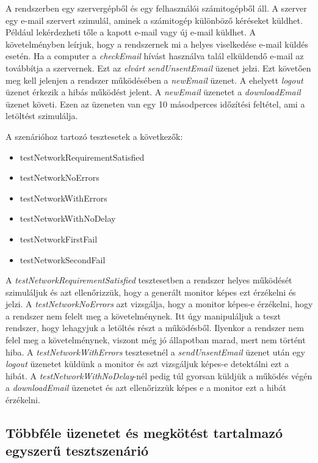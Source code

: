 A rendszerben egy szervergépből és egy felhasználói számitogépből áll.
A szerver egy e-mail szervert szimulál, aminek a számitogép különböző kéréseket küldhet.
Például lekérdezheti tőle a kapott e-mail vagy új e-mail küldhet.
A követelményben leírjuk, hogy a rendszernek mi a helyes viselkedése e-mail küldés esetén.
Ha a computer a \textit{checkEmail} hívást használva talál elküldendő e-mail az továbbítja a szervernek.
Ezt az \textit{elvárt} \textit{sendUnsentEmail} üzenet jelzi.
Ezt követően meg kell jelenjen a rendszer működésében a \textit{newEmail} üzenet.
A ehelyett \textit{logout} üzenet érkezik a hibás működést jelent.
A \textit{newEmail} üzenetet a \textit{downloadEmail} üzenet követi.
Ezen az üzeneten van egy 10 másodperces időzítési feltétel, ami a letöltést szimulálja.

A szenárióhoz tartozó tesztesetek a következők:

\begin{itemize}
    \item testNetworkRequirementSatisfied
    \item testNetworkNoErrors
    \item testNetworkWithErrors
    \item testNetworkWithNoDelay
    \item testNetworkFirstFail
    \item testNetworkSecondFail
\end{itemize}

A \textit{testNetworkRequirementSatisfied} tesztesetben a rendszer helyes működését szimuláljuk és azt ellenőrizzük, hogy a generált monitor képes ezt érzékelni és jelzi.
A \textit{testNetworkNoErrors} azt vizsgálja, hogy a monitor képes-e érzékelni, hogy a rendszer nem felelt meg a követelménynek.
Itt úgy manipuláljuk a teszt rendszer, hogy lehagyjuk a letöltés részt a működésből.
Ilyenkor a rendszer nem felel meg a követelménynek, viszont még jó állapotban marad, mert nem történt hiba.
A \textit{testNetworkWithErrors} tesztesetnél a \textit{sendUnsentEmail} üzenet után egy \textit{logout} üzenetet küldünk a monitor és azt vizsgáljuk képes-e detektálni ezt a hibát.
A \textit{testNetworkWithNoDelay}-nél pedig túl gyorsan küldjük a működés végén a \textit{downloadEmail} üzenetet és azt ellenőrizzük képes e a monitor ezt a hibát érzékelni.

\clearpage\subsection{Többféle üzenetet és megkötést tartalmazó egyszerű tesztszenárió}

